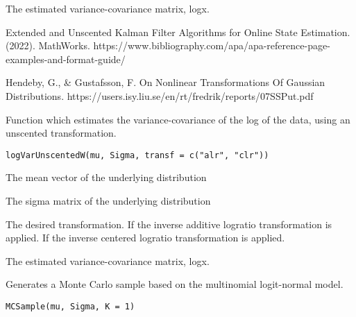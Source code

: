 \documentclass[a4paper]{book}
\begin{document}
%
\begin{Value}
The estimated variance-covariance matrix, logx.
\end{Value}
%
\begin{References}\relax
Extended and Unscented Kalman Filter Algorithms for Online State Estimation. 
(2022). MathWorks. https://www.bibliography.com/apa/apa-reference-page-examples-and-format-guide/

Hendeby, G., \& Gustafsson, F. On Nonlinear Transformations Of Gaussian Distributions. 
https://users.isy.liu.se/en/rt/fredrik/reports/07SSPut.pdf
\end{References}
%
\begin{Description}\relax
Function which estimates the variance-covariance of the log of the data, using an 
unscented transformation.
\end{Description}
%
\begin{Usage}
\begin{verbatim}
logVarUnscentedW(mu, Sigma, transf = c("alr", "clr"))
\end{verbatim}
\end{Usage}
%
\begin{Arguments}
\begin{ldescription}
\item[\code{mu}] The mean vector of the underlying distribution

\item[\code{Sigma}] The sigma matrix of the underlying distribution

\item[\code{transf}] The desired transformation. If  the inverse 
additive logratio transformation is applied. If  the
inverse centered logratio transformation is applied.
\end{ldescription}
\end{Arguments}
%
\begin{Value}
The estimated variance-covariance matrix, logx.
\end{Value}
%
\begin{Description}\relax
Generates a Monte Carlo sample based on the multinomial logit-normal model.
\end{Description}
%
\begin{Usage}
\begin{verbatim}
MCSample(mu, Sigma, K = 1)
\end{verbatim}
\end{Usage}
\end{document}
